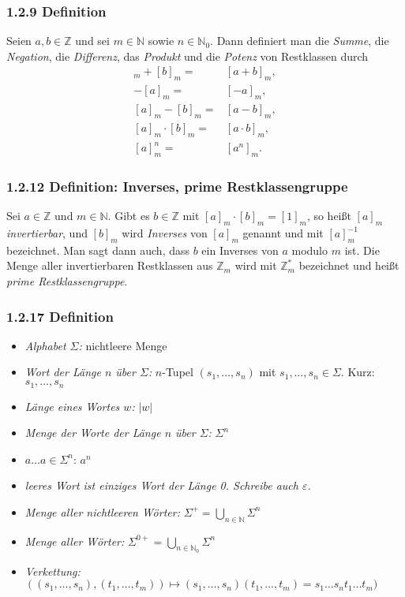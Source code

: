 \documentclass[12pt,a4paper]{scrartcl}
\begin{document}
            \subsubsection*{1.2.9 Definition}
                Seien $a,b \in \mathbb{Z}$ und sei $m \in \mathbb{N}$ sowie $n \in \mathbb{N}_0$. Dann definiert man die \emph{Summe}, die \emph{Negation}, die \emph{Differenz}, das \emph{Produkt} und die \emph{Potenz} von Restklassen durch
                \begin{align*}
                    [a]_m + [b]_m = & [a+b]_m, \\
                    - [a]_m = & [-a]_m, \\
                    [a]_m - [b]_m = & [a-b]_m, \\
                    [a]_m \cdot [b]_m = & [a \cdot b]_m, \\
                    [a]_m^n = & [a^n]_m.
                \end{align*}
            \subsubsection*{1.2.12 Definition: Inverses, prime Restklassengruppe}
                Sei $a \in \mathbb{Z}$ und $m \in \mathbb{N}$. Gibt es $b \in \mathbb{Z}$ mit $[a]_m \cdot [b]_m = [1]_m$, so heißt $[a]_m$ \emph{invertierbar}, und $[b]_m$ wird \emph{Inverses} von $[a]_m$ genannt und mit $[a]_m^{-1}$ bezeichnet. Man sagt dann auch, dass $b$ ein Inverses von $a$ modulo $m$ ist. Die Menge aller invertierbaren Restklassen aus $\mathbb{Z}_m$ wird mit $\mathbb{Z}_m^*$ bezeichnet und heißt \emph{prime Restklassengruppe}.
            \subsubsection*{1.2.17 Definition}
                \begin{itemize}
                    \item \emph{Alphabet $\Sigma$:} nichtleere Menge
                    \item \emph{Wort der Länge $n$ über $\Sigma$:} $n$-Tupel $\left(s_1, \ldots, s_n\right)$ mit $s_1, \ldots, s_n \in \Sigma$. Kurz: $s_1, \ldots, s_n$
                    \item \emph{Länge eines Wortes $w$:} $|w|$
                    \item \emph{Menge der Worte der Länge $n$ über $\Sigma$:} $\Sigma^n$
                    \item \emph{$a \dots a \in \Sigma^n$}: $a^n$
                    \item \emph{leeres Wort ist einziges Wort der Länge 0. Schreibe auch $\varepsilon$. }
                    \item \emph{Menge aller nichtleeren Wörter:} $\Sigma^+=\bigcup_{n\in\mathbb{N}}\Sigma^n$
                    \item \emph{Menge aller Wörter:} $\Sigma^{0+}=\bigcup_{n\in\mathbb{N}_0} \Sigma^n$
                    \item \emph{Verkettung:} \\$((s_1,\ldots,s_n),(t_1,\ldots,t_m))\mapsto (s_1,\ldots,s_n)(t_1,\ldots,t_m) =s_1\ldots s_n t_1\ldots t_m)$
                \end{itemize}
\end{document}
